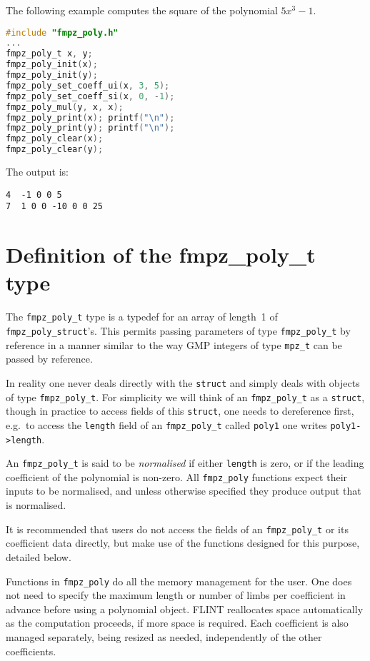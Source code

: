 \documentclass[a4paper,10pt]{book}
\newcommand{\code}{\lstinline}
\begin{document}
The following example computes the square of the polynomial $5x^3 - 1$.
\begin{lstlisting}[language=c]
#include "fmpz_poly.h"
...
fmpz_poly_t x, y;
fmpz_poly_init(x);
fmpz_poly_init(y);
fmpz_poly_set_coeff_ui(x, 3, 5);
fmpz_poly_set_coeff_si(x, 0, -1);
fmpz_poly_mul(y, x, x);
fmpz_poly_print(x); printf("\n");
fmpz_poly_print(y); printf("\n");
fmpz_poly_clear(x);
fmpz_poly_clear(y);
\end{lstlisting}

The output is:
\begin{lstlisting}
4  -1 0 0 5
7  1 0 0 -10 0 0 25
\end{lstlisting}

\section{Definition of the fmpz\_poly\_t type}

The \code{fmpz_poly_t} type is a typedef for an array of length~1 of 
\code{fmpz_poly_struct}'s.  This permits passing parameters of type 
\code{fmpz_poly_t} by reference in a manner similar to the way GMP integers 
of type \code{mpz_t} can be passed by reference. 

In reality one never deals directly with the \code{struct} and simply deals 
with objects of type \code{fmpz_poly_t}.  For simplicity we will think of an 
\code{fmpz_poly_t} as a \code{struct}, though in practice to access fields 
of this \code{struct}, one needs to dereference first, e.g.\ to access the 
\code{length} field of an \code{fmpz_poly_t} called \code{poly1} one writes 
\code{poly1->length}. 

An \code{fmpz_poly_t} is said to be \emph{normalised} if either 
\code{length} is zero, or if the leading coefficient of the polynomial is 
non-zero.  All \code{fmpz_poly} functions expect their inputs to be 
normalised, and unless otherwise specified they produce output that is 
normalised. 

It is recommended that users do not access the fields of an 
\code{fmpz_poly_t} or its coefficient data directly, but make use of the 
functions designed for this purpose, detailed below.

Functions in \code{fmpz_poly} do all the memory management for the user. 
One does not need to specify the maximum length or number of limbs per 
coefficient in advance before using a polynomial object.  FLINT reallocates 
space automatically as the computation proceeds, if more space is required. 
Each coefficient is also managed separately, being resized as needed, 
independently of the other coefficients.
\end{document}
